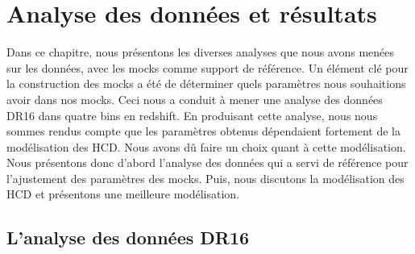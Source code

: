 
% 

% 


\graphicspath{ {../figures/data_ana/} }

\chapter{Analyse des données et résultats}
\label{chap:data_ana}
\minitoc
\newpage
\thispagestyle{fancy}

Dans ce chapitre, nous présentons les diverses analyses que nous avons menées sur les données, avec les mocks comme support de référence.
Un élément clé pour la construction des mocks a été de déterminer quels paramètres \lya{} nous souhaitions avoir dans nos mocks.
Ceci nous a conduit à mener une analyse des données DR16 dans quatre bins en redshift.
En produisant cette analyse, nous nous sommes rendus compte que les paramètres \lya{} obtenus dépendaient fortement de la modélisation des HCD. Nous avons dû faire un choix quant à cette modélisation.
Nous présentons donc d'abord l'analyse des données qui a servi de référence pour l'ajustement des paramètres des mocks. Puis, nous discutons la modélisation des HCD et présentons une meilleure modélisation.



\section{L'analyse des données DR16}

